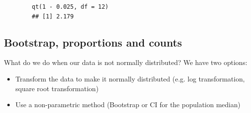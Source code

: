 \documentclass[a4paper, 10pt]{article}
\begin{document}
\begin{examplebox}
    \begin{lstlisting}
        qt(1 - 0.025, df = 12)
        ## [1] 2.179
    \end{lstlisting}
\end{examplebox}

\subsection{Bootstrap, proportions and counts}
What do we do when our data is not normally distributed? We have two options:
\begin{itemize}
    \item Transform the data to make it normally distributed (e.g. log transformation, square root transformation)
    \item Use a non-parametric method (Bootstrap or CI for the population median)
\end{itemize}
\end{document}

